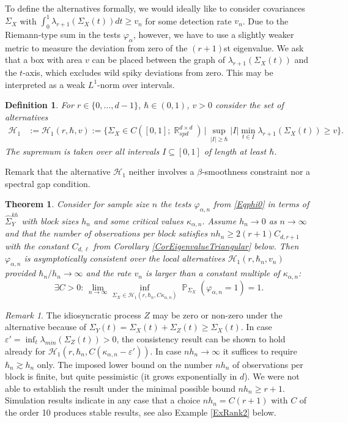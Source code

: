 \documentclass[preprint,aos]{imsart}
\numberwithin{equation}{section}
\newtheorem{theorem}[satz]{Theorem}
\newtheorem{definition}[satz]{Definition}
\theoremstyle{remark}
\newtheorem{remark}[satz]{Remark}
\DeclareMathOperator{\R}{{\mathbb R}}
\DeclareMathOperator{\PP}{{\mathbb P}}
\providecommand{\eps}{\varepsilon}
\renewcommand{\phi}{\varphi}
\renewcommand{\subset}{\subseteq}
\providecommand{\abs}[1]{\lvert #1 \rvert}
\renewcommand{\ge}{\geqslant}
\begin{document}
To define the alternatives formally, we would ideally like to consider covariances $\Sigma_X$ with $\int_0^1\lambda_{r+1}(\Sigma_X(t))dt\ge v_n$ for some detection rate $v_n$. Due to the Riemann-type sum in the tests $\phi_\alpha$, however, we have to use a slightly weaker metric to measure the deviation from zero of the $(r+1)$st eigenvalue. We ask that a box with area $v$ can be placed between the graph of $\lambda_{r+1}(\Sigma_X(t))$ and the $t$-axis, which excludes wild spiky deviations from zero. This may be interpreted as a weak $L^1$-norm over intervals.

\begin{definition}
For $r\in\{0,\ldots,d-1\}$, $\hbar\in (0,1)$, $v>0$ consider the set of alternatives
\begin{align*}
{\mathcal H}_1&:={\mathcal H}_1(r,\hbar,v)
:= \Big\{\Sigma_X\in C([0,1];\R_{spd}^{d\times d})\,\Big|\, \sup_{\abs{I}\ge \hbar}\abs{I}\min_{t\in I}\lambda_{r+1}(\Sigma_X(t))\ge v\Big\}.
\end{align*}
The supremum is taken over all intervals $I\subset[0,1]$ of length at least $\hbar$.
\end{definition}

Remark that the alternative ${\mathcal H}_1$  neither involves a $\beta$-smoothness constraint nor a spectral gap condition.

\begin{theorem}\label{ThmPower}
Consider for sample size $n$ the tests $\phi_{\alpha,n}$ from \eqref{Eqphi0}  in terms of $\hat\Sigma_Y^{kh}$ with block sizes $h_n$ and some critical values $\kappa_{\alpha,n}$. Assume $h_n\to 0$ as $n\to\infty$ and that the number of observations per block satisfies $nh_n\ge 2(r+1)C_{d,r+1}$ with the constant $C_{d,\ell}$ from Corollary \ref{CorEigenvalueTriangular} below. Then $\phi_{\alpha,n}$ is asymptotically consistent  over the local alternatives ${\mathcal H}_1(r,\hbar_n,v_n)$ provided $\hbar_n/h_n\to\infty$ and the rate $v_n$ is larger than a constant multiple of $\kappa_{\alpha,n}$:
\[ \exists C>0:\,\lim_{n\to\infty} \inf_{\Sigma_X\in {\mathcal H}_1(r,\hbar_n,C\kappa_{\alpha,n})}\PP_{\Sigma_X}(\phi_{\alpha,n}=1)=1.\]
\end{theorem}

\begin{remark}
The idiosyncratic process $Z$ may be zero  or non-zero  under the alternative because of $\Sigma_Y(t)=\Sigma_X(t)+\Sigma_Z(t)\ge\Sigma_X(t)$. In case $\eps'=\inf_t\lambda_{min}(\Sigma_Z(t))>0$, the consistency result can be shown to hold already for ${\mathcal H}_1(r,\hbar_n,C(\kappa_{\alpha,n}-\eps'))$. In case $nh_n\to\infty$ it suffices to require $\hbar_n\gtrsim h_n$ only. The imposed lower bound on the number $nh_n$ of observations per block is finite, but quite pessimistic (it grows exponentially in $d$). We were not able to establish the result under the minimal possible bound $nh_n\ge r+1$. Simulation results indicate in any case that a choice $nh_n=C(r+1)$ with $C$ of the order 10 produces  stable results, see also Example \ref{ExRank2} below.
\end{remark}
\end{document}
